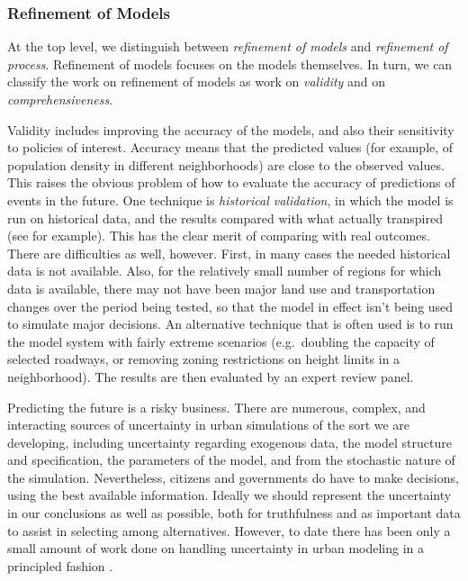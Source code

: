 \subsubsection{Refinement of Models}

At the top level, we distinguish between \emph{refinement of models} and
\emph{refinement of process}.  Refinement of models focuses on the models
themselves.  In turn, we can classify the work on refinement of models
as work on \emph{validity} and on \emph{comprehensiveness}.

Validity includes improving the accuracy of the models, and also their
sensitivity to policies of interest.  Accuracy means that the predicted
values (for example, of population density in different neighborhoods) are
close to the observed values.  This raises the obvious problem of how to
evaluate the accuracy of predictions of events in the future.  One
technique is \emph{historical validation}, in which the model is run on
historical data, and the results compared with what actually transpired
(see \cite{waddell-japa-2002} for example). This has the clear merit of
comparing with real outcomes.  There are
difficulties as well, however.  First, in many cases the needed historical
data is not available.  Also, for the relatively small number of regions
for which data is available, there may not have been major land use and
transportation changes over the period being tested, so that the model in
effect isn't being used to simulate major decisions.  An alternative
technique that is
often used is to run the model system with fairly extreme scenarios
(e.g.\ doubling the capacity of selected roadways, or removing zoning
restrictions on height limits in a neighborhood).  The results are then
evaluated by an expert review panel.

Predicting the future is a risky business.  There are numerous,
complex, and interacting sources of uncertainty in urban simulations
of the sort we are developing, including uncertainty regarding
exogenous data, the model structure and specification, the
parameters of the model, and from the stochastic nature of the
simulation. Nevertheless, citizens and governments do have to make
decisions, using the best available information. Ideally we should
represent the uncertainty in our conclusions as well as possible,
both for truthfulness and as important data to assist in selecting
among alternatives.  However, to date there has been only a small
amount of work done on handling uncertainty in urban modeling in a
principled fashion \cite{sevcikova-trb-2006}.


